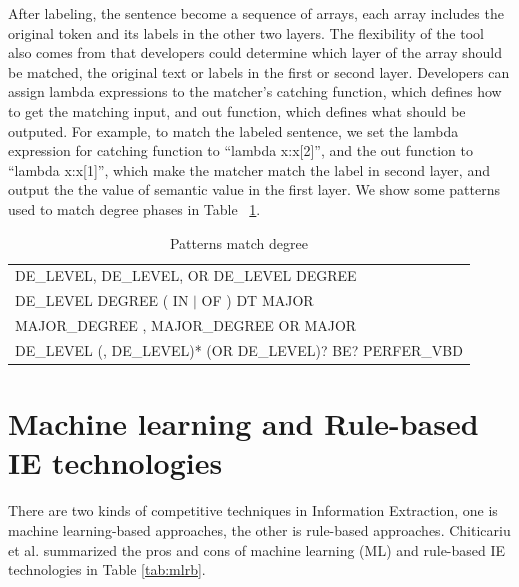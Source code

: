 After labeling, the sentence become a sequence of arrays, each array includes the original token and its labels in the other two layers. The flexibility of the tool also comes from that developers could determine which layer of the array should be matched, the original text or labels in the first or second layer.  Developers can assign lambda expressions to the matcher's catching function, which defines how to get the matching input,  and out function, which defines what should be outputed. For example, to match the labeled sentence, we set the lambda expression for catching function to ``lambda x:x[2]'', and the out function to ``lambda x:x[1]'', which make the matcher match the label in second layer, and output the the value of semantic value in the first layer. We show some patterns used to match degree phases in Table ~\ref{tab:patterns}.

\begin{table}[ht]
\small
\caption{Patterns match degree} %
\centering %
\begin{tabular}{  | l  |  }
 \hline
 DE\_LEVEL,  DE\_LEVEL, OR  DE\_LEVEL DEGREE   \\
 DE\_LEVEL DEGREE ( IN  $\vert$  OF ) DT MAJOR   \\
 MAJOR\_DEGREE  ,  MAJOR\_DEGREE OR MAJOR \\
 DE\_LEVEL (, DE\_LEVEL)* (OR DE\_LEVEL)? BE? PERFER\_VBD   \\
 \hline
\end{tabular}
\label{tab:patterns} %
\end{table}

\section{Machine learning and Rule-based IE technologies}

There are two kinds of competitive techniques in Information Extraction, one is machine learning-based approaches, the other is rule-based approaches. Chiticariu et al. \cite{chiticariu2013rule} summarized the pros and cons of machine learning (ML) and rule-based IE technologies in Table \ref{tab:mlrb}.


